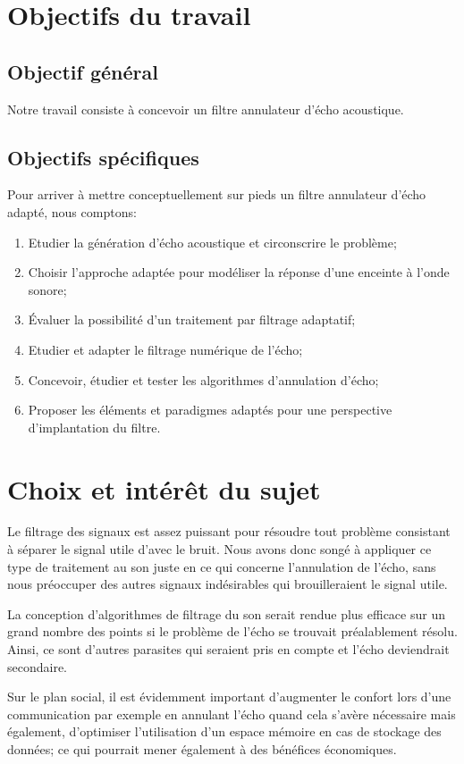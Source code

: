 \section{Objectifs du travail}
\subsection{Objectif général}
Notre travail consiste à concevoir un filtre annulateur d'écho acoustique. 
\subsection{Objectifs spécifiques}
Pour arriver à mettre conceptuellement sur pieds un filtre annulateur d'écho adapté, nous comptons:
\begin{enumerate}
\item Etudier la génération d'écho acoustique et circonscrire le problème;
\item Choisir l'approche adaptée pour modéliser la réponse d'une enceinte à l'onde sonore;
\item Évaluer la possibilité d'un traitement par filtrage adaptatif;
\item Etudier et adapter le filtrage numérique de l'écho;
\item Concevoir, étudier et tester les algorithmes d'annulation d'écho;
\item Proposer les éléments et paradigmes adaptés pour une perspective d'implantation du filtre.
\end{enumerate}
\section{Choix et intérêt du sujet}
Le filtrage des signaux est assez puissant pour résoudre tout problème consistant à séparer le signal utile d'avec le bruit. Nous avons donc songé à appliquer ce type de traitement au son juste en ce qui concerne l'annulation de l'écho, sans nous préoccuper des autres signaux indésirables qui brouilleraient le signal utile.%

La conception d'algorithmes de filtrage du son serait rendue plus efficace sur un grand nombre des points si le problème de l'écho se trouvait préalablement résolu. Ainsi, ce sont d'autres parasites qui seraient pris en compte et l'écho deviendrait secondaire.

Sur le plan social, il est évidemment important d'augmenter le confort lors d'une communication par exemple en annulant l'écho quand cela s'avère nécessaire mais également, d'optimiser l'utilisation d'un espace mémoire en cas de stockage des données; ce qui pourrait mener également à des bénéfices économiques.

